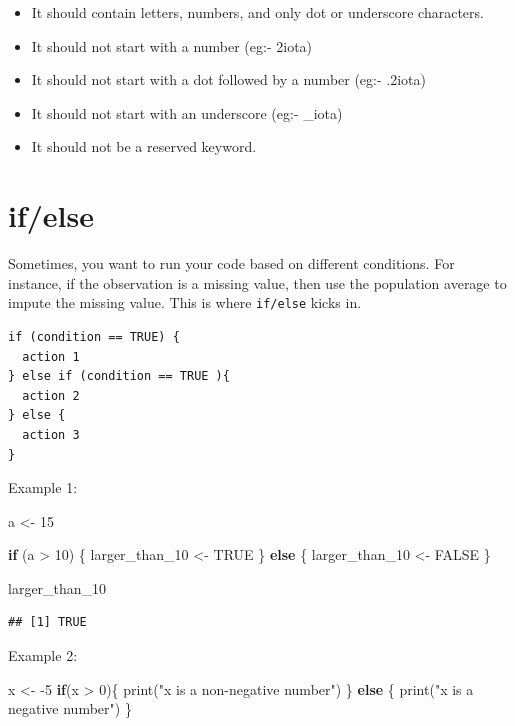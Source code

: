 \documentclass[
  11pt,
]{book}
\newenvironment{Shaded}{\begin{snugshade}}{\end{snugshade}}
\newcommand{\ConstantTok}[1]{\textcolor[rgb]{0.00,0.00,0.00}{#1}}
\newcommand{\ControlFlowTok}[1]{\textcolor[rgb]{0.13,0.29,0.53}{\textbf{#1}}}
\newcommand{\DecValTok}[1]{\textcolor[rgb]{0.00,0.00,0.81}{#1}}
\newcommand{\FunctionTok}[1]{\textcolor[rgb]{0.00,0.00,0.00}{#1}}
\newcommand{\NormalTok}[1]{#1}
\newcommand{\OtherTok}[1]{\textcolor[rgb]{0.56,0.35,0.01}{#1}}
\newcommand{\SpecialCharTok}[1]{\textcolor[rgb]{0.00,0.00,0.00}{#1}}
\newcommand{\StringTok}[1]{\textcolor[rgb]{0.31,0.60,0.02}{#1}}
\providecommand{\tightlist}{%
  \setlength{\itemsep}{0pt}\setlength{\parskip}{0pt}}
\begin{document}
\begin{itemize}
\tightlist
\item
  It should contain letters, numbers, and only dot or underscore characters.
\item
  It should not start with a number (eg:- 2iota)
\item
  It should not start with a dot followed by a number (eg:- .2iota)
\item
  It should not start with an underscore (eg:- \_iota)
\item
  It should not be a reserved keyword.
\end{itemize}

\hypertarget{ifelse}{%
\section{if/else}\label{ifelse}}

Sometimes, you want to run your code based on different conditions. For instance, if the observation is a missing value, then use the population average to impute the missing value. This is where \texttt{if/else} kicks in.

\begin{verbatim}
if (condition == TRUE) {
  action 1
} else if (condition == TRUE ){
  action 2
} else {
  action 3
}
\end{verbatim}

Example 1:

\begin{Shaded}
\begin{Highlighting}[]
\NormalTok{a }\OtherTok{\textless{}{-}} \DecValTok{15}

\ControlFlowTok{if}\NormalTok{ (a }\SpecialCharTok{\textgreater{}} \DecValTok{10}\NormalTok{) \{}
\NormalTok{larger\_than\_10 }\OtherTok{\textless{}{-}} \ConstantTok{TRUE}  
\NormalTok{\} }\ControlFlowTok{else}\NormalTok{ \{}
\NormalTok{  larger\_than\_10 }\OtherTok{\textless{}{-}} \ConstantTok{FALSE}
\NormalTok{\}}

\NormalTok{larger\_than\_10  }
\end{Highlighting}
\end{Shaded}

\begin{verbatim}
## [1] TRUE
\end{verbatim}

Example 2:

\begin{Shaded}
\begin{Highlighting}[]
\NormalTok{x }\OtherTok{\textless{}{-}} \SpecialCharTok{{-}}\DecValTok{5}
\ControlFlowTok{if}\NormalTok{(x }\SpecialCharTok{\textgreater{}} \DecValTok{0}\NormalTok{)\{}
  \FunctionTok{print}\NormalTok{(}\StringTok{"x is a non{-}negative number"}\NormalTok{)}
\NormalTok{\} }\ControlFlowTok{else}\NormalTok{ \{}
  \FunctionTok{print}\NormalTok{(}\StringTok{"x is a negative number"}\NormalTok{)}
\NormalTok{\}}
\end{Highlighting}
\end{Shaded}
\end{document}
